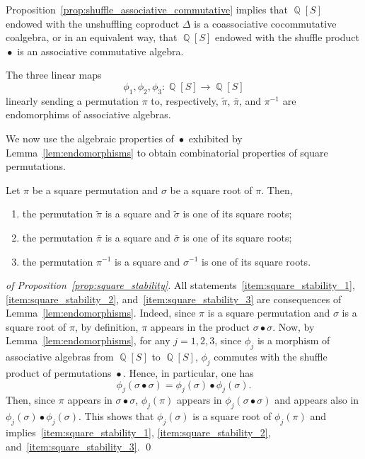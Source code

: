 \documentclass[a4paper]{llncs}
\DeclareMathOperator{\QQ}{\mathbb{Q}}
\DeclareMathOperator{\SHUFFLE}{\bullet}
\begin{document}
Proposition~\ref{prop:shuffle_associative_commutative} implies that
$\QQ[S]$ endowed with the unshuffling coproduct $\Delta$ is a
coassociative cocommutative coalgebra, or in an equivalent way, that
$\QQ[S]$ endowed with the shuffle product $\SHUFFLE$ is an associative
commutative algebra.

\begin{lemma} \label{lem:endomorphisms}
    The three linear maps
    \begin{equation}
        \phi_1, \phi_2, \phi_3 : \QQ[S] \to \QQ[S]
    \end{equation}
    linearly sending a permutation $\pi$ to, respectively,
    $\widetilde{\pi}$, $\bar \pi$, and $\pi^{-1}$ are endomorphims of
    associative algebras.
\end{lemma}

We now use the algebraic properties of $\SHUFFLE$ exhibited by
Lemma~\ref{lem:endomorphisms} to obtain combinatorial properties
of square permutations.

\begin{proposition} \label{prop:square_stability}
    Let $\pi$ be a square permutation and $\sigma$ be a square root of
    $\pi$. Then,
    \begin{enumerate}[label={\it (\roman*)},fullwidth]
        \item \label{item:square_stability_1}
        the permutation $\widetilde{\pi}$ is a square and
        $\widetilde{\sigma}$ is one of its square roots;
        \item \label{item:square_stability_2}
        the permutation $\bar \pi$ is a square and $\bar \sigma$ is one of
        its square roots;
        \item \label{item:square_stability_3}
        the permutation $\pi^{-1}$ is a square and $\sigma^{-1}$ is one of
        its square roots.
    \end{enumerate}
\end{proposition}
\begin{proof}[of Proposition~\ref{prop:square_stability}]
    All statements~\ref{item:square_stability_1},
    \ref{item:square_stability_2}, and~\ref{item:square_stability_3} are
    consequences of Lemma~\ref{lem:endomorphisms}. Indeed,
    since $\pi$ is a square permutation and $\sigma$ is a square root of
    $\pi$, by definition, $\pi$ appears in the product
    $\sigma \SHUFFLE \sigma$. Now, by Lemma~\ref{lem:endomorphisms},
    for any $j = 1, 2, 3$, since $\phi_j$ is a morphism of associative
    algebras from $\QQ[S]$ to $\QQ[S]$, $\phi_j$ commutes with the
    shuffle product of permutations $\SHUFFLE$. Hence, in particular,
    one has
    \begin{equation}
        \phi_j(\sigma \SHUFFLE \sigma) =
        \phi_j(\sigma) \SHUFFLE \phi_j(\sigma).
    \end{equation}
    Then, since $\pi$ appears in $\sigma \SHUFFLE \sigma$, $\phi_j(\pi)$
    appears in $\phi_j(\sigma \SHUFFLE \sigma)$ and appears also in
    $\phi_j(\sigma) \SHUFFLE \phi_j(\sigma)$. This shows that
    $\phi_j(\sigma)$ is a square root of $\phi_j(\pi)$ and
    implies~\ref{item:square_stability_1}, \ref{item:square_stability_2},
    and~\ref{item:square_stability_3}.
    \qed
\end{proof}
\end{document}
